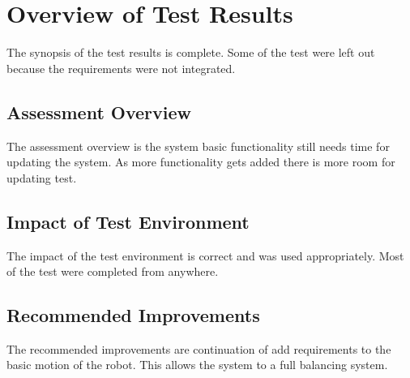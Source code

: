 
\chapter{Overview of Test Results}
\label{loc:OverviewTestResults}


The synopsis of the test results is complete. Some of the test were left out because the requirements were not integrated.

\section{Assessment Overview}
\label{loc:AssessmentOverview}


The assessment overview is the system basic functionality still needs time for updating the system. As more functionality gets added there is more room for updating test.


\section{Impact of Test Environment}
\label{loc:ImpactOfTestEnvironment}


The impact of the test environment is correct and was used appropriately. Most of the test were completed from anywhere.


\section{Recommended Improvements}
\label{loc:RecommendedImprovements}


The recommended improvements are continuation of add requirements to the basic motion of the robot. This allows the system to a full balancing system.
